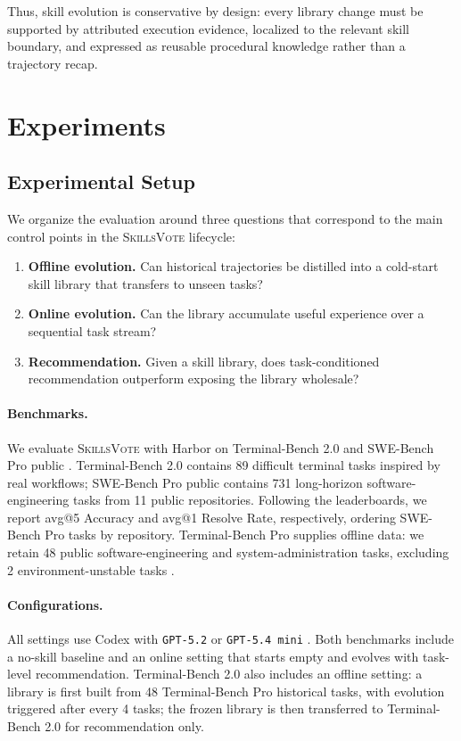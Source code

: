\documentclass{llmxive}
\providecommand{\ours}{\textsc{SkillsVote}\xspace}
\begin{document}
Thus, skill evolution is conservative by design: every library change must be supported by attributed execution evidence, localized to the relevant skill boundary, and expressed as reusable procedural knowledge rather than a trajectory recap.


\section{Experiments}
\subsection{Experimental Setup}
We organize the evaluation around three questions that correspond to the main control points in the \ours lifecycle:
\begin{enumerate}
    \item \textbf{Offline evolution.} Can historical trajectories be distilled into a cold-start skill library that transfers to unseen tasks?
    \item \textbf{Online evolution.} Can the library accumulate useful experience over a sequential task stream?
    \item \textbf{Recommendation.} Given a skill library, does task-conditioned recommendation outperform exposing the library wholesale?
\end{enumerate}

\paragraph{Benchmarks.}
We evaluate \ours with Harbor on Terminal-Bench 2.0 and SWE-Bench Pro public \citep{harborFramework,merrill2026terminal,deng2025swe}. Terminal-Bench 2.0 contains 89 difficult terminal tasks inspired by real workflows; SWE-Bench Pro public contains 731 long-horizon software-engineering tasks from 11 public repositories. Following the leaderboards, we report avg@5 Accuracy and avg@1 Resolve Rate, respectively, ordering SWE-Bench Pro tasks by repository. Terminal-Bench Pro supplies offline data: we retain 48 public software-engineering and system-administration tasks, excluding 2 environment-unstable tasks \citep{wang2025let}.

\paragraph{Configurations.}
All settings use Codex with \texttt{GPT-5.2} or \texttt{GPT-5.4 mini} \citep{openai2025gpt52,openai2026gpt54MiniNano}. Both benchmarks include a no-skill baseline and an online setting that starts empty and evolves with task-level recommendation. Terminal-Bench 2.0 also includes an offline setting: a library is first built from 48 Terminal-Bench Pro historical tasks, with evolution triggered after every 4 tasks; the frozen library is then transferred to Terminal-Bench 2.0 for recommendation only.
\end{document}
